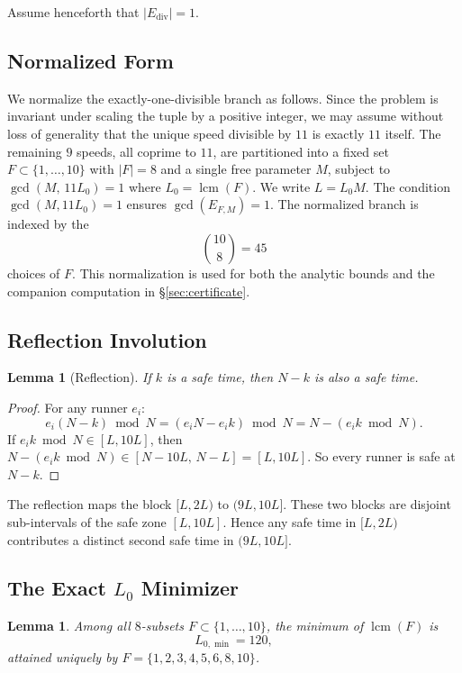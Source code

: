 \documentclass[11pt]{article}
\newtheorem{lemma}[theorem]{Lemma}
\theoremstyle{definition}
\newcommand{\Ediv}{E_{\mathrm{div}}}
\begin{document}
Assume henceforth that $|\Ediv| = 1$.

\subsection{Normalized Form}
\label{sec:normalization}

We normalize the exactly-one-divisible branch as follows.
Since the problem is invariant under scaling the tuple by a positive
integer, we may assume without loss of generality that the unique speed
divisible by $11$ is exactly $11$ itself.
The remaining $9$ speeds, all coprime to $11$, are partitioned into a
fixed set $F \subset \{1,\ldots,10\}$ with $|F| = 8$ and a single free
parameter $M$, subject to $\gcd(M,\, 11 L_0) = 1$ where
$L_0 = \operatorname{lcm}(F)$.
We write $L = L_0 M$.
The condition $\gcd(M, 11 L_0) = 1$ ensures $\gcd(E_{F,M}) = 1$.
The normalized branch is indexed by the
\[
  \binom{10}{8} = 45
\]
choices of $F$.
This normalization is used for both the analytic bounds and the companion
computation in \S\ref{sec:certificate}.

\subsection{Reflection Involution}
\label{sec:reflection}

\begin{lemma}[Reflection]
  \label{lem:reflection}
  If $k$ is a safe time, then $N - k$ is also a safe time.
\end{lemma}

\begin{proof}
  For any runner $e_i$:
  \[
    e_i (N - k) \bmod N
    = (e_i N - e_i k) \bmod N
    = N - (e_i k \bmod N).
  \]
  If $e_i k \bmod N \in [L, 10L]$, then
  $N - (e_i k \bmod N) \in [N - 10L,\, N - L] = [L, 10L]$.
  So every runner is safe at $N - k$.
\end{proof}

The reflection maps the block $[L, 2L)$ to $(9L, 10L]$.
These two blocks are disjoint sub-intervals of the safe zone $[L, 10L]$.
Hence any safe time in $[L, 2L)$ contributes a distinct second safe time
in $(9L, 10L]$.

\subsection{The Exact $L_0$ Minimizer}
\label{sec:minimizer}

\begin{lemma}
  \label{lem:l0min}
  Among all $8$-subsets $F \subset \{1,\ldots,10\}$, the minimum of
  $\operatorname{lcm}(F)$ is
  \[
    L_{0,\min} = 120,
  \]
  attained uniquely by $F = \{1,2,3,4,5,6,8,10\}$.
\end{lemma}
\end{document}
